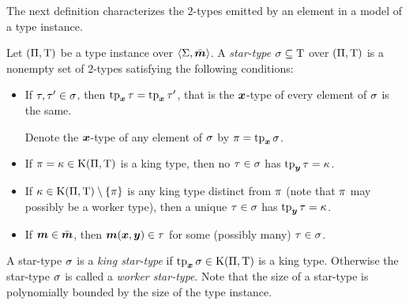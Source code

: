 The next definition characterizes the $2$-types emitted by an element in a model
of a type instance.
\begin{definition}
Let $(\Pi,\mathrm{T})$ be a type instance over $\left\langle \mathrm{\Sigma},\bar{\bm{m}} \right\rangle$.
A \emph{star-type} $\sigma \subseteq \mathrm{T}$ over $(\Pi,\mathrm{T})$ is a nonempty
set of $2$-types satisfying the following conditions:
\begin{itemize}
  \item[\condstpx]\label{cond:stpx}
  If $\tau, {\tau'} \in \sigma$, then $\operatorname{tp}_{\bm{x}}\tau = \operatorname{tp}_{\bm{x}}{\tau'}$, that is the
  $\bm{x}$-type of every element of $\sigma$ is the same.

  Denote the $\bm{x}$-type of any element of $\sigma$ by $\pi = \operatorname{tp}_{\bm{x}}\sigma$.
  \item[\condstpkx]\label{cond:stpkx}
  If $\pi = \kappa \in \mathrm{K}(\Pi,\mathrm{T})$ is a king type, then no
  $\tau\in\sigma$ has $\operatorname{tp}_{\bm{y}}\tau = \kappa$.
  \item[\condstpky]\label{cond:stpky}
  If $\kappa \in \mathrm{K}(\Pi,\mathrm{T}) \setminus \left\{\pi\right\}$ is any king type distinct
  from $\pi$ (note that $\pi$ may possibly be a worker type), then
  a unique $\tau\in\sigma$ has $\operatorname{tp}_{\bm{y}}\tau = \kappa$.
  \item[\condstpm]\label{cond:stpm} If $\bm{m} \in \bar{\bm{m}}$, then $\bm{m}(\bm{x},\bm{y})
  \in \tau$ for some (possibly many) $\tau \in \sigma$.
\end{itemize}
A star-type $\sigma$ is a \emph{king star-type} if $\operatorname{tp}_{\bm{x}}\sigma \in
\mathrm{K}(\Pi,\mathrm{T})$ is a king type. 
Otherwise the star-type $\sigma$ is called a \emph{worker star-type}.
Note that the size of a star-type is polynomially bounded by the size of the
type instance.
\end{definition}


